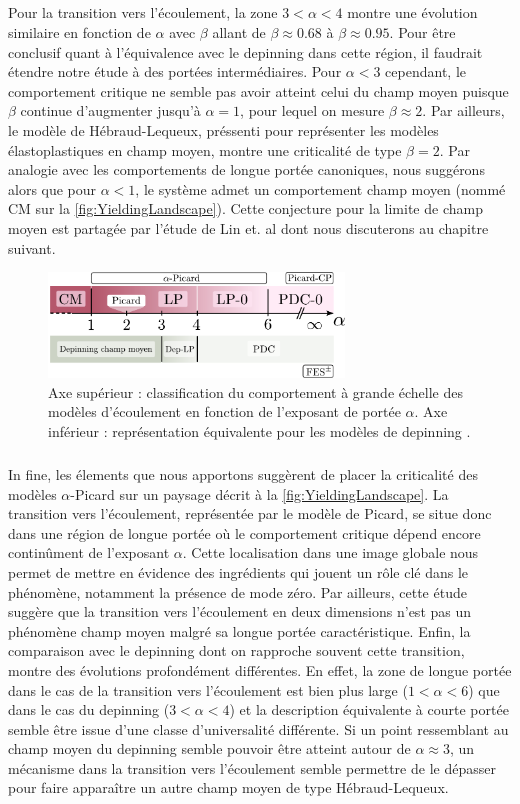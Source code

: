 \subparagraph{}Pour la transition vers l'écoulement, la zone $3<\alpha<4$ montre une évolution similaire en fonction de $\alpha$ avec $\beta$ allant de $\beta\approx 0.68$ à $\beta\approx 0.95$. Pour être conclusif quant à l'équivalence avec le depinning dans cette région, il faudrait étendre notre étude à des portées intermédiaires. Pour $\alpha<3$ cependant, le comportement critique ne semble pas avoir atteint celui du champ moyen puisque $\beta$ continue d'augmenter jusqu'à $\alpha=1$, pour lequel on mesure $\beta\approx 2$. Par ailleurs, le modèle de Hébraud-Lequeux, préssenti pour représenter les modèles élastoplastiques en champ moyen, montre une criticalité de type $\beta=2$. Par analogie avec les comportements de longue portée canoniques, nous suggérons alors que pour $\alpha<1$, le système admet un comportement champ moyen (nommé CM sur la \autoref{fig:YieldingLandscape}). Cette conjecture pour la limite de champ moyen est partagée par l'étude de Lin et. al \cite{lin_mean-field_2016} dont nous discuterons au chapitre suivant.

\begin{figure}[h]
	\centering
	\includegraphics[width=0.7\textwidth]{Chapitre4/Figures/LonguePortee/axe_alpha.pdf}
	\caption{Axe supérieur : classification du comportement à grande échelle des modèles d'écoulement en fonction de l'exposant de portée $\alpha$. Axe inférieur : représentation équivalente pour les modèles de depinning \cite{cao_localization_2018}.}
	\label{fig:YieldingLandscape}
\end{figure}

\subparagraph{}In fine, les élements que nous apportons suggèrent de placer la criticalité des modèles $\alpha$-Picard sur un paysage décrit à la \autoref{fig:YieldingLandscape}. La transition vers l'écoulement, représentée par le modèle de Picard, se situe donc dans une région de longue portée où le comportement critique dépend encore continûment de l'exposant $\alpha$. Cette localisation dans une image globale nous permet de mettre en évidence des ingrédients qui jouent un rôle clé dans le phénomène, notamment la présence de mode zéro. Par ailleurs, cette étude suggère que la transition vers l'écoulement en deux dimensions n'est pas un phénomène champ moyen malgré sa longue portée caractéristique. Enfin, la comparaison avec le depinning dont on rapproche souvent cette transition, montre des évolutions profondément différentes. En effet, la zone de longue portée dans le cas de la transition vers l'écoulement est bien plus large ($1<\alpha<6$) que dans le cas du depinning ($3<\alpha<4$) et la description équivalente à courte portée semble être issue d'une classe d'universalité différente. Si un point ressemblant au champ moyen du depinning semble pouvoir être atteint autour de $\alpha\approx 3$, un mécanisme dans la transition vers l'écoulement semble permettre de le dépasser pour faire apparaître un autre champ moyen de type Hébraud-Lequeux.

